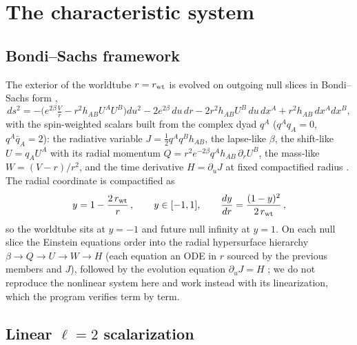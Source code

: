 \section{The characteristic system}
\label{sec:characteristic}

\subsection{Bondi--Sachs framework}
\label{sec:bsframe}

The exterior of the worldtube $r = r_{\rm wt}$ is evolved on outgoing
null slices in Bondi--Sachs form
\cite{Bondi:1962px,Sachs:1962wk,Moxon:2020gha},
\begin{equation}
ds^2 = -\Big(e^{2\beta}\tfrac{V}{r} - r^2 h_{AB}U^AU^B\Big)du^2
 - 2e^{2\beta}\,du\,dr - 2r^2 h_{AB}U^B\,du\,dx^A
 + r^2 h_{AB}\,dx^A dx^B,
\label{eq:bsmetric}
\end{equation}
with the spin-weighted scalars built from the complex dyad $q^A$
($q^Aq_A = 0$, $q^A\bar q_A = 2$): the radiative variable
$J = \tfrac12 q^Aq^Bh_{AB}$, the lapse-like $\beta$, the shift-like
$U = q_AU^A$ with its radial momentum
$Q = r^2 e^{-2\beta} q^A h_{AB}\,\partial_r U^B$, the mass-like
$W = (V-r)/r^2$, and the time derivative $H = \partial_u J$ at fixed
compactified radius \cite{Moxon:2020gha}. The radial coordinate is
compactified as
\begin{equation}
y = 1 - \frac{2\,r_{\rm wt}}{r}\,,
\qquad y \in [-1, 1],\qquad
\frac{dy}{dr} = \frac{(1-y)^2}{2\,r_{\rm wt}}\,,
\label{eq:ycomp}
\end{equation}
so the worldtube sits at $y=-1$ and future null infinity at $y=1$. On
each null slice the Einstein equations order into the radial
hypersurface hierarchy
$\beta \to Q \to U \to W \to H$
(each equation an ODE in $r$ sourced by the previous members and $J$),
followed by the evolution equation $\partial_u J = H$
\cite{Bondi:1962px,Moxon:2020gha,Ma:2023qjn}; we do not reproduce the
nonlinear system here and work instead with its linearization, which the
program verifies term by term.

\subsection{Linear $\ell=2$ scalarization}
\label{sec:scalarization}

